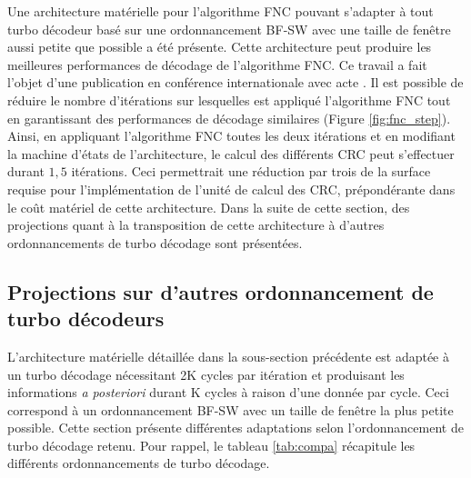Une architecture matérielle pour l'algorithme FNC pouvant s'adapter à tout turbo décodeur basé sur une 
ordonnancement BF-SW avec une taille de fenêtre aussi petite que possible a été présente. Cette architecture peut produire les meilleures
performances de décodage de l'algorithme FNC.  Ce travail a fait l'objet d'une publication en
conférence internationale avec acte . Il est possible de réduire le nombre d'itérations sur lesquelles 
est appliqué l’algorithme FNC tout en garantissant des performances de décodage similaires (Figure \ref{fig:fnc_step}).
Ainsi, en appliquant l'algorithme FNC toutes les deux itérations et en modifiant la machine d'états de l'architecture, 
le calcul des différents CRC peut s'effectuer durant $1,5$ itérations. Ceci permettrait une réduction  par 
trois de la surface 
requise pour l'implémentation de l'unité de calcul des CRC, prépondérante dans le coût matériel de cette architecture. 
Dans la suite de cette section, des
projections quant à la transposition de cette architecture à d'autres ordonnancements de turbo décodage sont présentées.

\subsection{Projections sur d'autres ordonnancement de turbo décodeurs}
L'architecture matérielle détaillée dans la sous-section précédente est adaptée à un turbo décodage nécessitant 2K 
cycles par itération et produisant les informations \textit{a posteriori} durant K cycles à raison d'une donnée par 
cycle. Ceci correspond à un ordonnancement BF-SW avec un taille de fenêtre la plus petite possible. Cette section présente 
différentes adaptations selon l'ordonnancement de turbo décodage retenu. Pour rappel, le tableau \ref{tab:compa} récapitule
les différents ordonnancements de turbo décodage.

